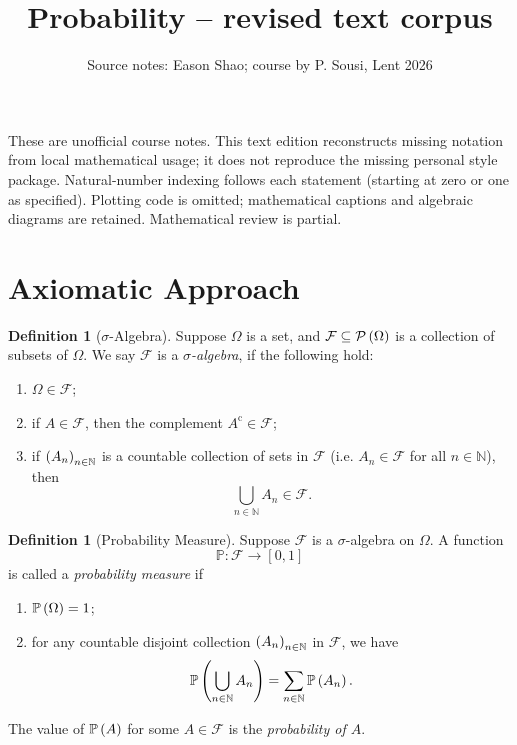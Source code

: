 \documentclass{article}
\title{Probability -- revised text corpus}
\author{Source notes: Eason Shao; course by P. Sousi, Lent 2026}
\date{}
\theoremstyle{definition}
\newtheorem{definition}[theorem]{Definition}
\theoremstyle{remark}
\newcommand{\NN}{\mathbb{N}}
\newcommand{\Prob}{\mathbb{P}}
\newcommand{\eventSpace}{\mathcal{F}}
\newcommand{\powerset}{\mathcal{P}}
\newcommand{\compl}{^{\mathrm{c}}}
\newcommand{\ccintv}[2]{[#1,#2]}
\newcommand{\functiondomain}[3]{#1:#2\to #3}
\begin{document}
\maketitle
These are unofficial course notes. This text edition reconstructs missing notation from local mathematical usage; it does not reproduce the missing personal style package. Natural-number indexing follows each statement (starting at zero or one as specified). Plotting code is omitted; mathematical captions and algebraic diagrams are retained. Mathematical review is partial.
\section{Axiomatic Approach}

\begin{definition}[\(\sigma\)-Algebra]
    \label{def:sigma-algebra}%
    Suppose \(\Omega\) is a set, and \(\eventSpace \subseteq \powerset\pqty{\Omega}\) is a collection of subsets of \(\Omega\). We say \(\eventSpace\) is a \emph{\(\sigma\)-algebra}, if the following hold:
    \begin{enumerate}
        \item \(\Omega \in \eventSpace\);
        \item if \(A \in \eventSpace\), then the complement \(A\compl \in \eventSpace\);
        \item if \(\pqty{A_n}_{n \in \NN}\) is a countable collection of sets in \(\eventSpace\) (i.e. \(A_n \in \eventSpace\) for all \(n \in \NN\)), then
        \[
            \bigcup_{n \in \NN} A_n \in \eventSpace.
        \]
    \end{enumerate}
\end{definition}

\begin{definition}[Probability Measure]
    \label{def:probability-measure}%
    Suppose \(\eventSpace\) is a \(\sigma\)-algebra on \(\Omega\). A function
    \[
        \functiondomain{\Prob}{\eventSpace}{\ccintv{0}{1}}
    \]
    is called a \emph{probability measure} if
    \begin{enumerate}
        \item \(\Prob\pqty{\Omega} = 1\);
        \item for any countable disjoint collection \(\pqty{A_n}_{n \in \NN}\) in \(\eventSpace\), we have
        \[
            \Prob\pqty{\bigcup_{n \in \NN} A_n} = \sum_{n \in \NN} \Prob\pqty{A_n}.
        \]
    \end{enumerate}

    The value of \(\Prob\pqty{A}\) for some \(A \in \eventSpace\) is the \emph{probability of \(A\)}.
\end{definition}
\end{document}
